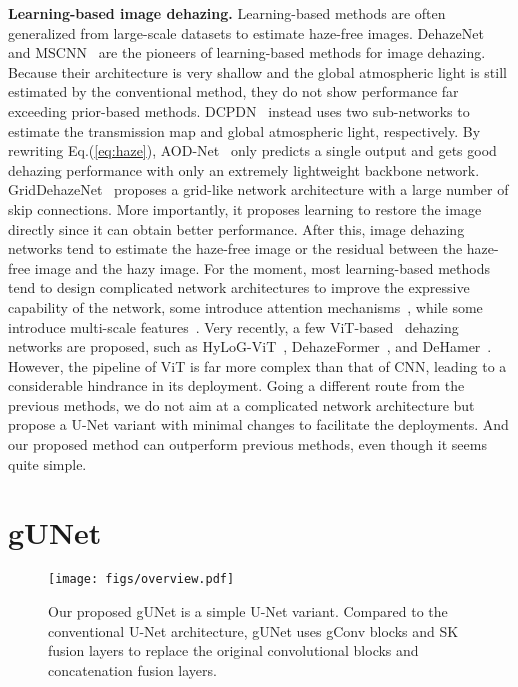 \documentclass[10pt,twocolumn,letterpaper]{article}
\begin{document}
\noindent\textbf{Learning-based image dehazing.}
Learning-based methods are often generalized from large-scale datasets to estimate haze-free images.
DehazeNet~\cite{cai2016dehazenet} and MSCNN~\cite{ren2016single} are the pioneers of learning-based methods for image dehazing.
Because their architecture is very shallow and the global atmospheric light is still estimated by the conventional method, they do not show performance far exceeding prior-based methods.
DCPDN~\cite{zhang2018densely} instead uses two sub-networks to estimate the transmission map and global atmospheric light, respectively.
By rewriting Eq.(\ref{eq:haze}), AOD-Net~\cite{li2017aod} only predicts a single output and gets good dehazing performance with only an extremely lightweight backbone network.
GridDehazeNet~\cite{liu2019griddehazenet} proposes a grid-like network architecture with a large number of skip connections. 
More importantly, it proposes learning to restore the image directly since it can obtain better performance.
After this, image dehazing networks tend to estimate the haze-free image or the residual between the haze-free image and the hazy image.
For the moment, most learning-based methods tend to design complicated network architectures to improve the expressive capability of the network, some introduce attention mechanisms~\cite{dong2020physics,deng2020hardgan,qin2020ffa,wu2021contrastive}, while some introduce multi-scale features~\cite{chen2019gated,dong2020multi,wang2021eaa}.
Very recently, a few ViT-based~\cite{dosovitskiy2020image} dehazing networks are proposed, such as HyLoG-ViT~\cite{zhao2021hybrid}, DehazeFormer~\cite{song2022vision}, and DeHamer~\cite{guo2022dehamer}.
However, the pipeline of ViT is far more complex than that of CNN, leading to a considerable hindrance in its deployment.
Going a different route from the previous methods, we do not aim at a complicated network architecture but propose a U-Net variant with minimal changes to facilitate the deployments. 
And our proposed method can outperform previous methods, even though it seems quite simple.

 \section{gUNet}

\begin{figure*}[!t]
    \centering
    \texttt{[image: figs/overview.pdf]}
    \caption{
        Our proposed gUNet is a simple U-Net variant.
        Compared to the conventional U-Net architecture, gUNet uses gConv blocks and SK fusion layers to replace the original convolutional blocks and concatenation fusion layers.
    }
    \label{fig:overview}
\end{figure*}
\end{document}
